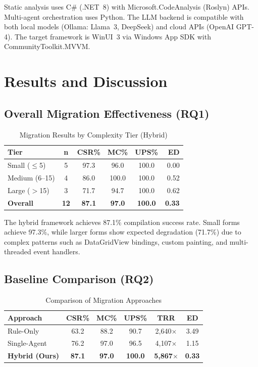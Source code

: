 \documentclass[conference]{IEEEtran}
\begin{document}
Static analysis uses C\# (.NET~8) with Microsoft.CodeAnalysis (Roslyn) APIs. Multi-agent orchestration uses Python. The LLM backend is compatible with both local models (Ollama: Llama~3, DeepSeek) and cloud APIs (OpenAI GPT-4). The target framework is WinUI~3 via Windows App SDK with CommunityToolkit.MVVM.

\section{Results and Discussion}

\subsection{Overall Migration Effectiveness (RQ1)}

\begin{table}[h]
\caption{Migration Results by Complexity Tier (Hybrid)}
\label{tab:tier_results}
\centering
\footnotesize
\begin{tabular}{lccccr}
\toprule
\textbf{Tier} & \textbf{n} & \textbf{CSR\%} & \textbf{MC\%} & \textbf{UPS\%} & \textbf{ED} \\
\midrule
Small ($\leq$5) & 5 & 97.3 & 96.0 & 100.0 & 0.00 \\
Medium (6--15) & 4 & 86.0 & 100.0 & 100.0 & 0.52 \\
Large ($>$15) & 3 & 71.7 & 94.7 & 100.0 & 0.62 \\
\midrule
\textbf{Overall} & \textbf{12} & \textbf{87.1} & \textbf{97.0} & \textbf{100.0} & \textbf{0.33} \\
\bottomrule
\end{tabular}
\end{table}

The hybrid framework achieves 87.1\% compilation success rate. Small forms achieve 97.3\%, while larger forms show expected degradation (71.7\%) due to complex patterns such as DataGridView bindings, custom painting, and multi-threaded event handlers.

\subsection{Baseline Comparison (RQ2)}

\begin{table}[h]
\caption{Comparison of Migration Approaches}
\label{tab:baseline}
\centering
\footnotesize
\begin{tabular}{lccccc}
\toprule
\textbf{Approach} & \textbf{CSR\%} & \textbf{MC\%} & \textbf{UPS\%} & \textbf{TRR} & \textbf{ED} \\
\midrule
Rule-Only & 63.2 & 88.2 & 90.7 & 2,640$\times$ & 3.49 \\
Single-Agent & 76.2 & 97.0 & 96.5 & 4,107$\times$ & 1.15 \\
\textbf{Hybrid (Ours)} & \textbf{87.1} & \textbf{97.0} & \textbf{100.0} & \textbf{5,867$\times$} & \textbf{0.33} \\
\bottomrule
\end{tabular}
\end{table}
\end{document}

